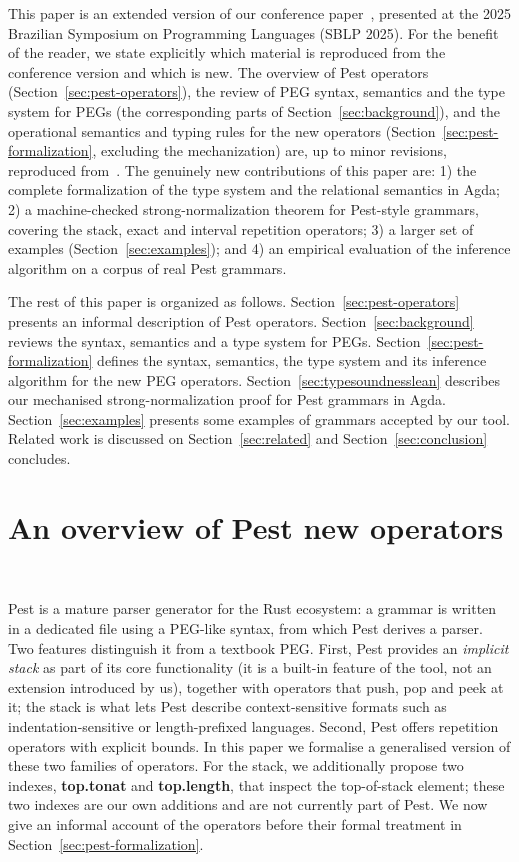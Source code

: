 \documentclass[preprint,12pt]{elsarticle}
\theoremstyle{definition}
\begin{document}
This paper is an extended version of our conference paper~\cite{Daher25},
presented at the 2025 Brazilian Symposium on Programming Languages (SBLP 2025).
For the benefit of the reader, we state explicitly which material is reproduced
from the conference version and which is new. The overview of Pest operators
(Section~\ref{sec:pest-operators}), the review of PEG syntax, semantics and the
type system for PEGs (the corresponding parts of Section~\ref{sec:background}),
and the operational semantics and typing rules for the new operators
(Section~\ref{sec:pest-formalization}, excluding the mechanization) are, up to
minor revisions, reproduced from~\cite{Daher25}. The genuinely new contributions
of this paper are: 1) the complete formalization of the type system and the
relational semantics in Agda; 2) a machine-checked
strong-normalization theorem for Pest-style grammars, covering the stack, exact
and interval repetition operators; 3) a
larger set of examples (Section~\ref{sec:examples}); and 4) an empirical
evaluation of the inference algorithm on a corpus of real Pest grammars.

The rest of this paper is organized as follows.
Section~\ref{sec:pest-operators} presents an informal description of Pest operators.
Section~\ref{sec:background}
reviews the syntax, semantics and a type system for PEGs.
Section~\ref{sec:pest-formalization} defines the syntax, semantics, the type
system and its inference algorithm for the new PEG operators. Section~\ref{sec:typesoundnesslean}
describes our mechanised strong-normalization proof for Pest grammars in Agda.
Section~\ref{sec:examples}
presents some examples of grammars accepted by our tool.
Related work is discussed on Section~\ref{sec:related} and
Section~\ref{sec:conclusion} concludes.


\section{An overview of Pest new operators}~\label{sec:pest-operators}

Pest is a mature parser generator for the Rust ecosystem: a grammar is written in
a dedicated file using a PEG-like syntax, from which Pest derives a parser. Two
features distinguish it from a textbook PEG. First, Pest provides an \emph{implicit
stack} as part of its core functionality (it is a built-in feature of the tool,
not an extension introduced by us), together with operators that push, pop and
peek at it; the stack is what lets Pest describe context-sensitive formats such as
indentation-sensitive or length-prefixed languages. Second, Pest offers repetition
operators with explicit bounds. In this paper we formalise a generalised version
of these two families of operators. For the stack, we additionally propose two
indexes, \textbf{top.tonat} and \textbf{top.length}, that inspect the top-of-stack
element; these two indexes are our own additions and are not currently part of
Pest. We now give an informal account of the operators before their formal
treatment in Section~\ref{sec:pest-formalization}.
\end{document}
